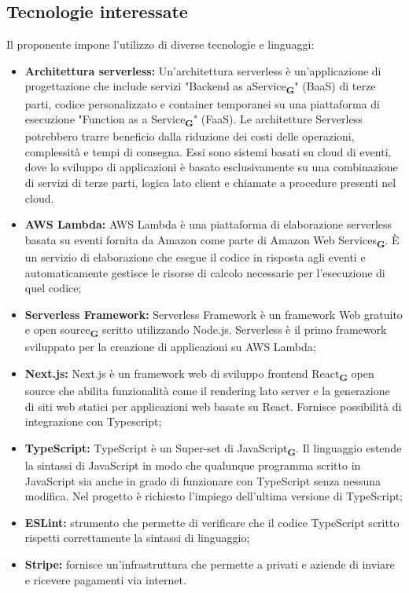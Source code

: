 \subsection{Tecnologie interessate}
Il proponente impone l’utilizzo di diverse tecnologie e linguaggi:
\begin{itemize}
    \item \textbf{Architettura serverless:} Un'architettura serverless è un’applicazione di progettazione che include servizi "Backend as aService\textsubscript{\textbf{G}}" (BaaS) di terze parti, codice personalizzato e container temporanei su una piattaforma di esecuzione "Function as a Service\textsubscript{\textbf{G}}" (FaaS). Le architetture Serverless potrebbero trarre beneficio dalla riduzione dei costi delle operazioni, complessità e tempi di consegna. Essi sono sistemi basati su cloud di eventi, dove lo sviluppo di applicazioni è basato esclusivamente su una combinazione di servizi di terze parti, logica lato client e chiamate a procedure presenti nel cloud.
    \item \textbf{AWS Lambda:} AWS Lambda è una piattaforma di elaborazione serverless basata su eventi fornita da Amazon come parte di Amazon Web Services\textsubscript{\textbf{G}}. È un servizio di elaborazione che esegue il codice in risposta agli eventi e automaticamente gestisce le risorse di calcolo necessarie per l'esecuzione di quel codice;
    \item \textbf{Serverless Framework:} Serverless Framework è un framework Web gratuito e open source\textsubscript{\textbf{G}} scritto utilizzando Node.js. Serverless è il primo framework sviluppato per la creazione di applicazioni su AWS Lambda;
    \item \textbf{Next.js:} Next.js è un framework web di sviluppo frontend React\textsubscript{\textbf{G}} open source che abilita funzionalità come il rendering lato server e la generazione di siti web statici per applicazioni web basate su React. Fornisce possibilità di integrazione con Typescript;
    \item \textbf{TypeScript:} TypeScript è un Super-set di JavaScript\textsubscript{\textbf{G}}. Il linguaggio estende la sintassi di JavaScript in modo che qualunque programma scritto in JavaScript sia anche in grado di funzionare con TypeScript senza nessuna modifica. Nel progetto è richiesto l'impiego dell'ultima versione di TypeScript;
    \item \textbf{ESLint:} strumento che permette di verificare che il codice TypeScript scritto rispetti correttamente la sintassi di linguaggio;
    \item \textbf{Stripe:} fornisce un’infrastruttura che permette a privati e aziende di inviare e ricevere pagamenti via internet.
\end{itemize}
